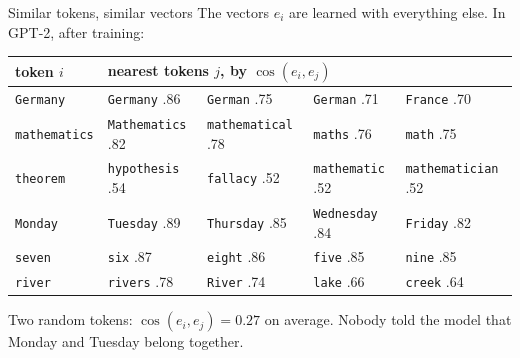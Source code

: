 \documentclass[10pt]{beamer}
\begin{document}
\begin{frame}{Similar tokens, similar vectors}
\small
The vectors $e_i$ are learned with everything else. In GPT-2, after training:

\medskip
\scriptsize
\renewcommand{\arraystretch}{1.25}
\setlength{\tabcolsep}{3pt}
\begin{tabular*}{\textwidth}{@{}l@{\extracolsep{\fill}}llll@{}}
\toprule
token $i$ & \multicolumn{4}{l}{nearest tokens $j$, by $\cos(e_i,e_j)$} \\
\midrule
\texttt{\textvisiblespace Germany}     & \texttt{Germany} .86      & \texttt{\textvisiblespace German} .75     & \texttt{German} .71        & \texttt{\textvisiblespace France} .70 \\
\texttt{\textvisiblespace mathematics} & \texttt{\textvisiblespace Mathematics} .82 & \texttt{\textvisiblespace mathematical} .78 & \texttt{\textvisiblespace maths} .76 & \texttt{\textvisiblespace math} .75 \\
\texttt{\textvisiblespace theorem}     & \texttt{\textvisiblespace hypothesis} .54 & \texttt{\textvisiblespace fallacy} .52 & \texttt{\textvisiblespace mathematic} .52 & \texttt{\textvisiblespace mathematician} .52 \\
\texttt{\textvisiblespace Monday}      & \texttt{\textvisiblespace Tuesday} .89  & \texttt{\textvisiblespace Thursday} .85   & \texttt{\textvisiblespace Wednesday} .84 & \texttt{\textvisiblespace Friday} .82 \\
\texttt{\textvisiblespace seven}       & \texttt{\textvisiblespace six} .87      & \texttt{\textvisiblespace eight} .86      & \texttt{\textvisiblespace five} .85      & \texttt{\textvisiblespace nine} .85 \\
\texttt{\textvisiblespace river}       & \texttt{\textvisiblespace rivers} .78   & \texttt{\textvisiblespace River} .74      & \texttt{\textvisiblespace lake} .66      & \texttt{\textvisiblespace creek} .64 \\
\bottomrule
\end{tabular*}

\medskip
\small
Two random tokens: $\cos(e_i,e_j)=0.27$ on average. \alert{Nobody told the model} that Monday and Tuesday belong together.
\end{frame}
\end{document}
